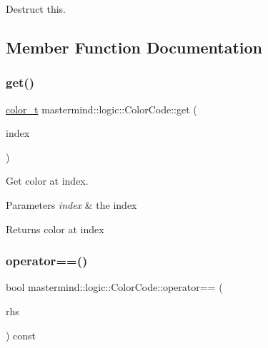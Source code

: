 Destruct this. 



\subsection{Member Function Documentation}
\hypertarget{classmastermind_1_1logic_1_1_color_code_afe89e87be3e662db633bd88d1b5656cf}{}\label{classmastermind_1_1logic_1_1_color_code_afe89e87be3e662db633bd88d1b5656cf} 
\subsubsection{\texorpdfstring{get()}{get()}}
{\footnotesize\ttfamily \hyperlink{namespacemastermind_1_1logic_aab4e2166db8e8e5dcbed785c7927eca1}{color\+\_\+t} mastermind\+::logic\+::\+Color\+Code\+::get (\begin{DoxyParamCaption}\item[{std\+::size\+\_\+t}]{index }\end{DoxyParamCaption})}



Get color at index. 


\begin{DoxyParams}{Parameters}
{\em index} & the index \\
\hline
\end{DoxyParams}
\begin{DoxyReturn}{Returns}
color at index 
\end{DoxyReturn}
\hypertarget{classmastermind_1_1logic_1_1_color_code_a2bb0b3f30f7a353348a7b73da5b47e19}{}\label{classmastermind_1_1logic_1_1_color_code_a2bb0b3f30f7a353348a7b73da5b47e19} 
\subsubsection{\texorpdfstring{operator==()}{operator==()}}
{\footnotesize\ttfamily bool mastermind\+::logic\+::\+Color\+Code\+::operator== (\begin{DoxyParamCaption}\item[{const \hyperlink{classmastermind_1_1logic_1_1_color_code}{Color\+Code} \&}]{rhs }\end{DoxyParamCaption}) const}



